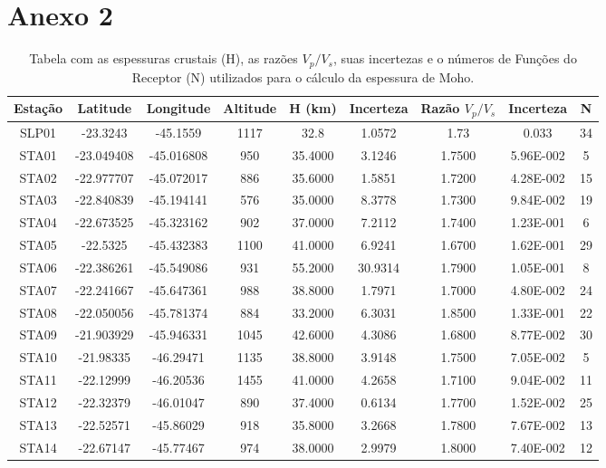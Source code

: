 \chapter*{Anexo 2}
\begin{center}
\begin{table}[!Ht]
\small
\caption{Tabela com as espessuras crustais (H), as razões $V_{p}/V_{s}$, suas incertezas e o números de Funções do Receptor (N) utilizados para o cálculo da espessura de Moho.}
\begin{tabular}{| c | c | c | c | c | c | c | c | c |}
\hline
{\textbf{Estação}} & {\textbf{Latitude}} & {\textbf{Longitude}} & {\textbf{Altitude}} & {\textbf{H (km)}} & {\textbf{Incerteza}} & {\textbf{Razão $V_{p}/V_{s}$}} & {\textbf{Incerteza}} & {\textbf{N}}\\
\hline 
SLP01 & -23.3243 & -45.1559 & 1117 & 32.8 & 1.0572 & 1.73 & 0.033 & 34\\
STA01 & -23.049408 & -45.016808 & 950 & 35.4000 & 3.1246 & 1.7500 & 5.96E-002 & 5\\
STA02 & -22.977707 & -45.072017 & 886 & 35.6000 & 1.5851 & 1.7200 & 4.28E-002 & 15\\
STA03 & -22.840839 & -45.194141 & 576 & 35.0000 & 8.3778 & 1.7300 & 9.84E-002 & 19\\
STA04 & -22.673525 & -45.323162 & 902 & 37.0000 & 7.2112 & 1.7400 & 1.23E-001 & 6\\
STA05 & -22.5325 & -45.432383 & 1100 & 41.0000 & 6.9241 & 1.6700 & 1.62E-001 & 29\\
STA06 & -22.386261 & -45.549086 & 931 & 55.2000 & 30.9314 & 1.7900 & 1.05E-001 & 8\\
STA07 & -22.241667 & -45.647361 & 988 & 38.8000 & 1.7971 & 1.7000 & 4.80E-002 & 24\\
STA08 & -22.050056 & -45.781374 & 884 & 33.2000 & 6.3031 & 1.8500 & 1.33E-001 & 22\\
STA09 & -21.903929 & -45.946331 & 1045 & 42.6000 & 4.3086 & 1.6800 & 8.77E-002 & 30\\
STA10 & -21.98335 & -46.29471 & 1135 & 38.8000 & 3.9148 & 1.7500 & 7.05E-002 & 5\\
STA11 & -22.12999 & -46.20536 & 1455 & 41.0000 & 4.2658 & 1.7100 & 9.04E-002 & 11\\
STA12 & -22.32379 & -46.01047 & 890 & 37.4000 & 0.6134 & 1.7700 & 1.52E-002 & 25\\
STA13 & -22.52571 & -45.86029 & 918 & 35.8000 & 3.2668 & 1.7800 & 7.67E-002 & 13\\
STA14 & -22.67147 & -45.77467 & 974 & 38.0000 & 2.9979 & 1.8000 & 7.40E-002 & 12\\

\end{tabular}
\end{table}
\end{center}
